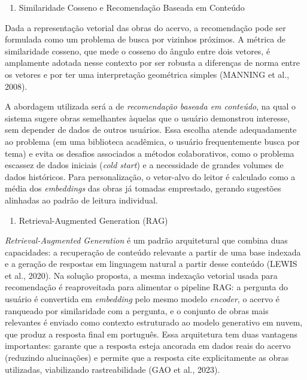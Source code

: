 \documentclass[
]{article}
\begin{document}
\begin{enumerate}
\def\labelenumi{\arabic{enumi}.}
\setcounter{enumi}{2}
\item
  \protect{}\label{_Toc230227812}{}Similaridade Cosseno e
  Recomendação Baseada em Conteúdo
\end{enumerate}

Dada a representação vetorial das obras do acervo, a recomendação pode
ser formulada como um problema de busca por vizinhos próximos. A métrica
de similaridade cosseno, que mede o cosseno do ângulo entre dois
vetores, é amplamente adotada nesse contexto por ser robusta a
diferenças de norma entre os vetores e por ter uma interpretação
geométrica simples (MANNING et al., 2008).

A abordagem utilizada será a de \emph{recomendação baseada em conteúdo},
na qual o sistema sugere obras semelhantes àquelas que o usuário
demonstrou interesse, sem depender de dados de outros usuários. Essa
escolha atende adequadamente ao problema (em uma biblioteca acadêmica, o
usuário frequentemente busca por tema) e evita os desafios associados a
métodos colaborativos, como o problema escassez de dados iniciais
(\emph{cold start}) e a necessidade de grandes volumes de dados
históricos. Para personalização, o vetor-alvo do leitor é calculado como
a média dos \emph{embeddings} das obras já tomadas emprestado, gerando
sugestões alinhadas ao padrão de leitura individual.

\begin{enumerate}
\def\labelenumi{\arabic{enumi}.}
\setcounter{enumi}{3}
\item
  \protect{}\label{_Toc230227813}{}Retrieval-Augmented
  Generation (RAG)
\end{enumerate}

\emph{Retrieval-Augmented Generation} é um padrão arquitetural que
combina duas capacidades: a recuperação de conteúdo relevante a partir
de uma base indexada e a geração de respostas em linguagem natural a
partir desse conteúdo (LEWIS et al., 2020). Na solução proposta, a mesma
indexação vetorial usada para recomendação é reaproveitada para
alimentar o pipeline RAG: a pergunta do usuário é convertida em
\emph{embedding} pelo mesmo modelo \emph{encoder}, o acervo é ranqueado
por similaridade com a pergunta, e o conjunto de obras mais relevantes é
enviado como contexto estruturado ao modelo generativo em nuvem, que
produz a resposta final em português. Essa arquitetura tem duas
vantagens importantes: garante que a resposta esteja ancorada em dados
reais do acervo (reduzindo alucinações) e permite que a resposta cite
explicitamente as obras utilizadas, viabilizando rastreabilidade (GAO et
al., 2023).
\end{document}
